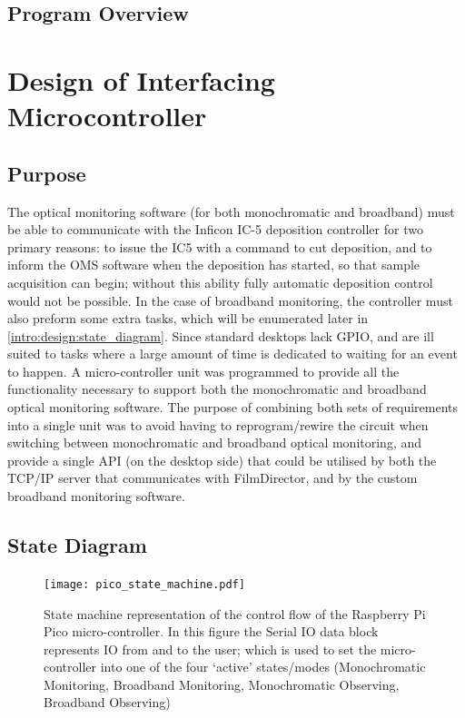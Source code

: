 \documentclass[10pt,a4paper,portrait]{report}
\begin{document}
\subsection{Program Overview}

\section{Design of Interfacing Microcontroller}
\subsection{Purpose}

The optical monitoring software (for both monochromatic and broadband) must be able to communicate with the Inficon IC-5 deposition controller for two primary reasons: to issue the IC5 with a command to cut deposition, and to inform the OMS software when the deposition has started, so that sample acquisition can begin;
without this ability fully automatic deposition control would not be possible.
In the case of broadband monitoring, the controller must also preform some extra tasks, which will be enumerated later in \ref{intro:design:state_diagram}. Since standard desktops lack GPIO, and are ill suited to tasks where a large amount of time is dedicated to waiting for an event to happen. A micro-controller unit was programmed to provide all the functionality necessary to support both the monochromatic and broadband optical monitoring software. The purpose of combining both sets of requirements into a single unit was to avoid having to reprogram/rewire the circuit when switching between monochromatic and broadband optical monitoring, and provide a single API (on the desktop side) that could be utilised by both the TCP/IP server that communicates with FilmDirector, and by the custom broadband monitoring software. 


\label{intro:design:state_diagram}
\subsection{State Diagram}

\begin{figure}[H]
\begin{center}
\centering
\texttt{[image: pico\_state\_machine.pdf]}
\end{center}
\vspace*{-5mm}
\caption{State machine representation of the control flow of the Raspberry Pi Pico micro-controller. In this figure the Serial IO data block represents IO from and to the user; which is used to set the micro-controller into one of the four `active' states/modes (Monochromatic Monitoring, Broadband Monitoring, Monochromatic Observing, Broadband Observing)}
\end{figure}
\end{document}
